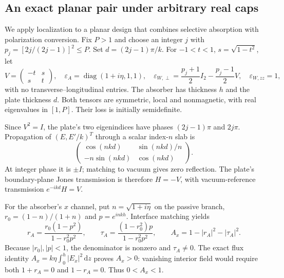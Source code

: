 \documentclass[11pt,a4paper]{article}
\theoremstyle{remark}
\newcommand{\abs}[1]{\lvert #1\rvert}
\newcommand{\dd}{\,\mathrm d}
\newcommand{\diag}{\operatorname{diag}}
\begin{document}
\subsection{An exact planar pair under arbitrary real caps}
We apply localization to a planar design that combines selective absorption with polarization conversion. Fix $P>1$ and choose an integer $j$ with $p_j=[2j/(2j-1)]^2\leq P$. Set $d=(2j-1)\pi/k$. For $-1<t<1$, $s=\sqrt{1-t^2}$, let
\[
 V=\begin{pmatrix}-t&s\\s&t\end{pmatrix},\quad
 \varepsilon_A=\diag(1+i\eta,1,1),\quad
 \varepsilon_{W,\perp}=\frac{p_j+1}{2}I_2-\frac{p_j-1}{2}V,\quad
 \varepsilon_{W,zz}=1,
\]
with no transverse--longitudinal entries. The absorber has thickness $h$ and the plate thickness $d$. Both tensors are symmetric, local and nonmagnetic, with real eigenvalues in $[1,P]$. Their loss is initially semidefinite.

Since $V^2=I$, the plate's two eigenindices have phases $(2j-1)\pi$ and $2j\pi$. Propagation of $(E,E'/k)^T$ through a scalar index-$n$ slab is
\[
 \begin{pmatrix}\cos(nkd)&\sin(nkd)/n\\-n\sin(nkd)&\cos(nkd)\end{pmatrix}.
\]
At integer phase it is $\pm I$; matching to vacuum gives zero reflection. The plate's boundary-plane Jones transmission is therefore $H=-V$, with vacuum-reference transmission $e^{-ikd}H=V$.

For the absorber's $x$ channel, put $n=\sqrt{1+i\eta}$ on the passive branch, $r_0=(1-n)/(1+n)$ and $p=e^{inkh}$. Interface matching yields
\[
 r_A=\frac{r_0(1-p^2)}{1-r_0^2p^2},\qquad
 \tau_A=\frac{(1-r_0^2)p}{1-r_0^2p^2},\qquad
 A_x=1-\abs{r_A}^2-\abs{\tau_A}^2.
\]
Because $\abs{r_0},\abs p<1$, the denominator is nonzero and $\tau_A\ne0$. The exact flux identity $A_x=k\eta\int_0^h\abs{E_x}^2\dd z$ proves $A_x>0$: vanishing interior field would require both $1+r_A=0$ and $1-r_A=0$. Thus $0<A_x<1$.
\end{document}

